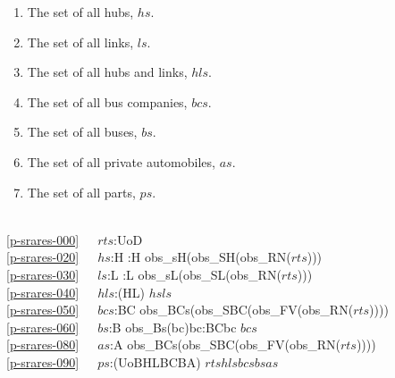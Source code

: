 \begin{enumerate}\setei
\item \label{p-srares-020} The set of all hubs, $hs$.  
\item \label{p-srares-030} The set of all links, $ls$.  
\item \label{p-srares-040} The set of all hubs and links, $hls$.  
\item \label{p-srares-050} The set of all bus companies, $bcs$.  
\item \label{p-srares-060} The set of all buses, $bs$. 
\item \label{p-srares-080} The set of all private automobiles, $as$.  
\item \label{p-srares-090} The set of all parts, $ps$. 
\savei\end{enumerate}\pos{\footsize}{}
\pos{\psno}{\mnewfoil}
\bp
{}\\
\ref{p-srares-000}\ \ \ $rts$:UoD \\
\ref{p-srares-020}\ \ \ $hs$:H {\IS}:H {\IS} obs\_sH(obs\_SH(obs\_RN($rts$)))\\
\ref{p-srares-030}\ \ \ $ls$:L {\IS}:L {\IS} obs\_sL(obs\_SL(obs\_RN($rts$)))\\
\ref{p-srares-040}\ \ \ $hls$:(H{\BAR}L) {\IS} $hs${\UNION}$ls$ \\
\ref{p-srares-050}\ \ \ $bcs$:BC {\IS} obs\_BCs(obs\_SBC(obs\_FV(obs\_RN($rts$))))\\
\ref{p-srares-060}\ \ \ $bs$:B {\IS} {\UNION}{\LBRACE}obs\_Bs(bc){\BAR}bc:BC{\RDOT}bc {\ISIN} $bcs${\RBRACE} \\
\ref{p-srares-080}\ \ \ $as$:A {\IS} obs\_BCs(obs\_SBC(obs\_FV(obs\_RN($rts$))))\ \ \\
\ref{p-srares-090}\ \ \ $ps$:(UoB{\BAR}H{\BAR}L{\BAR}BC{\BAR}B{\BAR}A) {\IS} $rts${\UNION}$hls${\UNION}$bcs${\UNION}$bs${\UNION}$as$\ \ 
\ep

